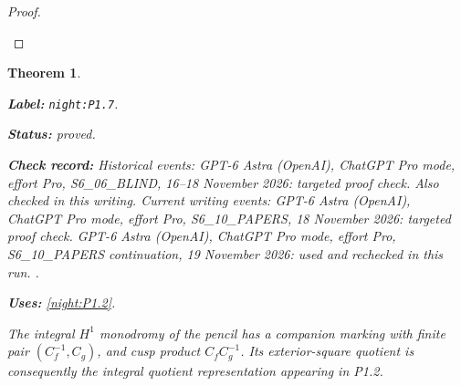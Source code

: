 \documentclass[11pt,a4paper]{article}
\newtheorem{theorem}{Theorem}[section]
\theoremstyle{definition}
\newcommand{\StatementRecord}[4]{\par\smallskip\begingroup\upshape\raggedright\noindent\textbf{Label:} \nolinkurl{#1}.\par\noindent\textbf{Status:} #2.\par\noindent\textbf{Check record:} #3.\par\noindent\textbf{Uses:} #4.\par\endgroup\smallskip}
\begin{document}
\begin{proof}
\begin{enumerate}[label=\arabic*.]
\end{enumerate}
\end{proof}




\begin{theorem}\label{night:P1.7}
\StatementRecord{night:P1.7}{proved}{Historical events: GPT-6 Astra (OpenAI), ChatGPT Pro mode, effort Pro, S6\_06\_BLIND, 16--18 November 2026: targeted proof check. Also checked in this writing. Current writing events: GPT-6 Astra (OpenAI), ChatGPT Pro mode, effort Pro, S6\_10\_PAPERS, 18 November 2026: targeted proof check. GPT-6 Astra (OpenAI), ChatGPT Pro mode, effort Pro, S6\_10\_PAPERS continuation, 19 November 2026: used and rechecked in this run. }{\cref{night:P1.2}}
The integral $H^1$ monodromy of the pencil has a companion marking with
finite pair $(C_f^{-1},C_g)$, and cusp product $C_fC_g^{-1}$.
Its exterior-square quotient is consequently the integral quotient
representation appearing in P1.2.
\end{theorem}
\end{document}
